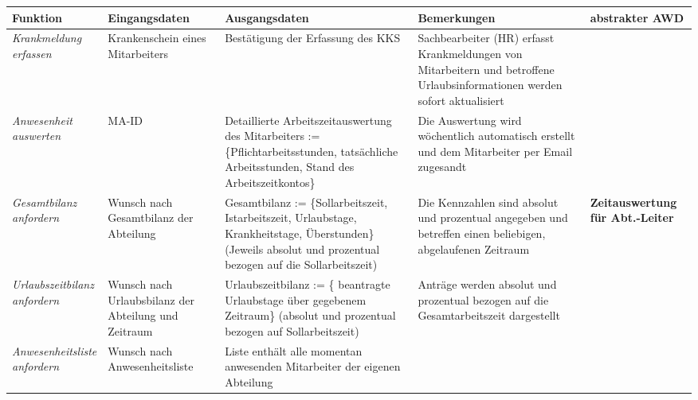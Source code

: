 {
\vspace{0,5cm}
\hspace{-3,5cm}
\footnotesize
\begin{tabular}{|p{3cm}|p{4cm}|p{4cm}|p{4cm}|p{2cm}|}
	\hline
		\textbf{Funktion	} &
		\textbf{Eingangsdaten} &
		\textbf{Ausgangsdaten}&
		\textbf{Bemerkungen}	&
		\textbf{abstrakter AWD} \\
	\hline \hline
		\textit{Krankmeldung \newline erfassen} &
		Krankenschein eines Mitarbeiters &
		Best\"atigung der Erfassung des KKS &
		Sachbearbeiter (HR) erfasst Krankmeldungen von Mitarbeitern und betroffene Urlaubsinformationen werden sofort aktualisiert &
		 \\
	\hline \hline
		\textit{Anwesenheit \newline auswerten} &
		MA-ID &
		Detaillierte Arbeitszeit\-aus\-wertung des Mitarbeiters := \newline \{Pflichtarbeitsstunden, tats\"achliche Arbeitsstunden, Stand des Arbeitszeitkontos\}&
		Die Auswertung wird wöchentlich automatisch erstellt und dem Mitarbeiter per Email zugesandt &
		 \\
	\hline \hline
		\textit{Gesamtbilanz \newline anfordern} &
		Wunsch nach Gesamtbilanz der Abteilung &
		Gesamtbilanz := \newline \{Sollarbeitszeit, Istarbeitszeit, Urlaubstage, Krankheitstage, \"Uberstunden\} (Jeweils absolut und prozentual bezogen auf die Sollarbeitszeit)  &
		Die Kennzahlen sind absolut und prozentual angegeben und betreffen einen beliebigen, abgelaufenen Zeitraum &
		\textbf{Zeitaus\-wertung für Abt.-Leiter}\\
	\cline{1-4}
		\textit{Urlaubszeitbilanz \newline anfordern} &
		Wunsch nach Urlaubsbilanz der Abteilung und Zeitraum&
		Urlaubszeitbilanz := \newline \{ beantragte Urlaubstage \"uber gegebenem Zeitraum\} (absolut und prozentual bezogen auf Sollarbeitszeit)&
		Anträge werden absolut und prozentual bezogen auf die Gesamtarbeitszeit dargestellt &
		\\
	\cline{1-4}
		\textit{Anwesenheitsliste \newline anfordern}&
		Wunsch nach Anwesenheitsliste &
		Liste enthält alle momentan anwesenden Mitarbeiter der eigenen Abteilung &
		&
		\\
	\hline
\end{tabular}
}

\vspace{1cm}

